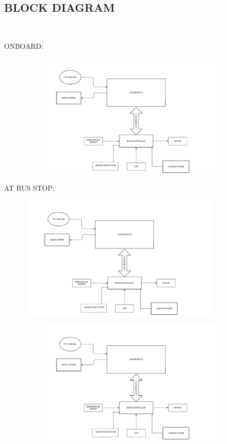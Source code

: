 \documentclass[12pt,a4paper,oneside]{report}
\begin{document}
\begin{onehalfspacing}
\begin{enumerate}
\newpage
\section{BLOCK DIAGRAM}
{$\;\;\;\;$}

ONBOARD:


\begin{figure}[h]
\includegraphics[width=15cm, height=6cm]{fig1.png}
\centering
\label{fig1}
\end{figure}

AT BUS STOP:



\begin{figure}[h]
\begin{center}
\leavevmode
\includegraphics[width=10cm, height=6cm]{fig2.png}
\end{center}
\label{fig2}
\end{figure}

\begin{figure}[h]
\begin{center}
\leavevmode
\includegraphics[width=15cm, height=6cm]{fig3.png}
\end{center}


\end{figure}
\end{enumerate}
\end{onehalfspacing}
\end{document}
